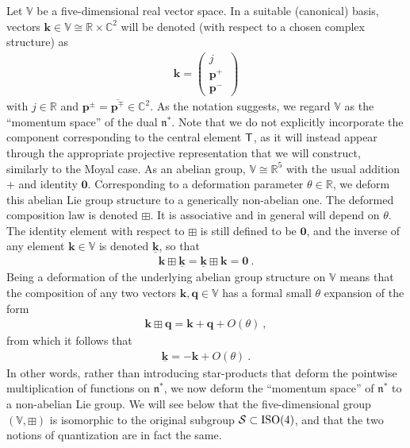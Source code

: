 \documentclass[11pt,a4paper]{article}
\newcommand{\comp}{\boxplus}                            %
\newcommand{\1}{\mathbb{1}}
\newcommand{\mbf}[1]{{\boldsymbol {#1} }}
\def\T{{\sf T}}
\def\mk{{\mbf k}}
\def\mq{{\mbf q}}
\def\mbp{{\mbf p}}
\def\mfn{{\mathfrak n}}
\newcommand{\complex}{{\mathbb C}} %
\newcommand{\real}{{\mathbb R}} %
\newcommand{\beq}{\begin{eqnarray}}
\newcommand{\eeq}{\end{eqnarray}}
\begin{document}
Let $\mathbb{V}$ be a five-dimensional real vector space. In a
suitable (canonical) basis, vectors
$\mk\in\mathbb{V}\cong\real\times\complex^2$ will be denoted (with
respect to a chosen complex structure) as
\beq
\mk=\begin{pmatrix}j\\\mbp^+\,\\\mbp^-\end{pmatrix}
\label{Svectors}\eeq
with $j\in\real$ and $\mbp^\pm=\overline{\mbp^\mp}\in\complex^2$. As
the notation suggests, we
regard $\mathbb{V}$ as the ``momentum space'' of the dual
$\mfn^*$. Note that we do not explicitly incorporate the component
corresponding to the central element $\T$, as it will instead appear
through the appropriate projective representation that we will construct,
similarly to the Moyal case. As an abelian group,
$\mathbb{V}\cong\real^5$ with the usual addition $+$ and identity
$\mbf0$. Corresponding to a deformation parameter
$\theta\in\real$, we deform this abelian Lie group structure to a
generically non-abelian one. The deformed composition law is denoted
$\comp$. It is associative and in general will depend on
$\theta$. The identity element with respect to $\comp$ is still
defined to be $\mbf0$, and the inverse of any element $\mk\in\mathbb{V}$
is denoted $\underline{\mk}$, so that
\beq
\mk\comp\underline{\mk}=\underline{\mk}\comp\mk=\mbf0 \ .
\label{compinverse}\eeq
Being a deformation of the underlying abelian group structure on
$\mathbb{V}$ means that the composition of any two vectors
$\mk,\mq\in\mathbb{V}$ has a formal small $\theta$ expansion of the
form
\beq
\mk\comp\mq=\mk+\mq+O(\theta) \ ,
\label{compsmalltheta}\eeq
from which it follows that
\beq
\underline{\mk}=-\mk+O(\theta) \ .
\label{compinvsmalltheta}\eeq
In other words, rather than introducing star-products that deform the
pointwise multiplication of functions on $\mfn^*$, we now deform the
``momentum space'' of $\mfn^*$ to a non-abelian Lie group.
We will see below that the five-dimensional group
$(\mathbb{V},\comp)$ is isomorphic to the original subgroup
$\mathcal{S}\subset{\rm ISO}(4)$, and that the two notions of
quantization are in fact the same.
\end{document}
